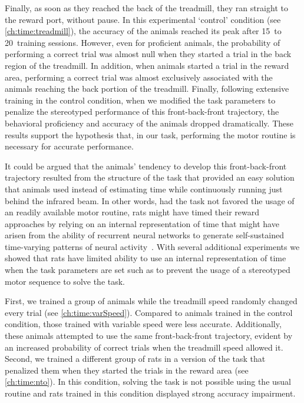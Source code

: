 Finally, as soon as they reached the back of the treadmill, they ran straight to the reward port, without pause.
In this experimental `control' condition (see \autoref{ch:time:treadmill}), the accuracy of the animals reached its peak after 15~to 20~training sessions.
However, even for proficient animals, the probability of performing a correct trial was almost null when they started a trial in the back region of the treadmill.
In addition, when animals started a trial in the reward area, performing a correct trial was almost exclusively associated with the animals reaching the back portion of the treadmill.
Finally, following extensive training in the control condition, when we modified the task parameters to penalize the stereotyped performance of this front-back-front trajectory, the behavioral proficiency and accuracy of the animals dropped dramatically.
These results support the hypothesis that, in our task, performing the motor routine is necessary for accurate performance.
\par
It could be argued that the animals' tendency to develop this front-back-front trajectory resulted from the structure of the task that provided an easy solution that animals used instead of estimating time while continuously running just behind the infrared beam.
In other words, had the task not favored the usage of an readily available motor routine, rats might have timed their reward approaches by relying on an internal representation of time that might have arisen from the ability of recurrent neural networks to generate self-sustained time-varying patterns of neural activity~\cite{Buonomano2011chapter}.
With several additional experiments we showed that rats have limited ability to use an internal representation of time when the task parameters are set such as to prevent the usage of a stereotyped motor sequence to solve the task.
\par
First, we trained a group of animals while the treadmill speed randomly changed every trial (see \autoref{ch:time:varSpeed}).
Compared to animals trained in the control condition, those trained with variable speed were less accurate.
Additionally, these animals attempted to use the same front-back-front trajectory, evident by an increased probability of correct trials when the treadmill speed allowed it.
Second, we trained a different group of rats in a version of the task that penalized them when they started the trials in the reward area (see \autoref{ch:time:nto}).
In this condition, solving the task is not possible using the usual routine and rats trained in this condition displayed strong accuracy impairment.
